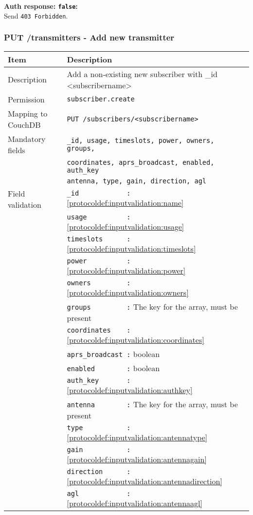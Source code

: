 \textbf{Auth response: \texttt{false}:}\\
Send \verb|403 Forbidden|.

\newpage
\subsubsection{PUT /transmitters - Add new transmitter}
\begin{table}[htbp]
  \begin{tabular}{|l|p{12cm}|} \hline
    Item               & Description  \\ \hline \hline
    Description        & Add a non-existing new subscriber with \_id <subscribername>\\ \hline
    Permission         & \verb|subscriber.create| \\ \hline
    Mapping to CouchDB & \verb|PUT /subscribers/<subscribername>|\\ \hline
    Mandatory fields   & \verb|_id, usage, timeslots, power, owners, groups,| \\
                       & \verb|coordinates, aprs_broadcast, enabled, auth_key|\\
                       & \verb|antenna, type, gain, direction, agl| \\ \hline
    Field validation   & \verb|_id            :| \ref{protocoldef:inputvalidation:name} \\
                       & \verb|usage          :| \ref{protocoldef:inputvalidation:usage}\\
                       & \verb|timeslots      :| \ref{protocoldef:inputvalidation:timeslots}\\
                       & \verb|power          :| \ref{protocoldef:inputvalidation:power} \\
                       & \verb|owners         :| \ref{protocoldef:inputvalidation:owners} \\
                       & \verb|groups         :| The key for the array, must be present \\ \hline
                       & \verb|coordinates    :| \ref{protocoldef:inputvalidation:coordinates} \\
                       & \verb|aprs_broadcast :| boolean \\
                       & \verb|enabled        :| boolean \\
                       & \verb|auth_key       :| \ref{protocoldef:inputvalidation:authkey} \\
                       & \verb|antenna        :| The key for the array, must be present \\
                       & \verb|type           :| \ref{protocoldef:inputvalidation:antennatype} \\
                       & \verb|gain           :| \ref{protocoldef:inputvalidation:antennagain}\\
                       & \verb|direction      :| \ref{protocoldef:inputvalidation:antennadirection}\\
                       & \verb|agl            :| \ref{protocoldef:inputvalidation:antennaagl}\\ \hline
  \end{tabular}
\end{table}
